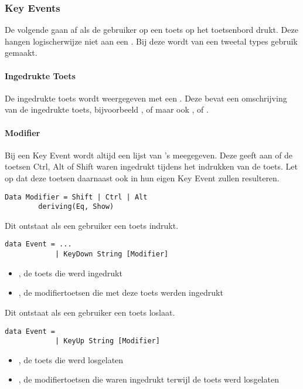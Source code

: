 \subsubsection{Key Events}
De volgende \events {}gaan af als de gebruiker op een toets op het toetsenbord drukt. Deze hangen logischerwijze niet aan een \shape. 
Bij deze \events wordt van een tweetal types gebruik gemaakt. 

\paragraph{Ingedrukte Toets}
De ingedrukte toets wordt weergegeven met een . Deze bevat een omschrijving van de ingedrukte toets, bijvoorbeeld ,  of  maar ook ,  of .

\paragraph{Modifier}
Bij een Key Event wordt altijd een lijst van 's meegegeven. Deze geeft aan of de toetsen Ctrl, Alt of Shift waren ingedrukt tijdens het indrukken van de toets. Let op dat deze toetsen daarnaast ook in hun eigen Key Event zullen resulteren.
\begin{lstlisting}
Data Modifier = Shift | Ctrl | Alt
		deriving(Eq, Show)
\end{lstlisting}

Dit  ontstaat als een gebruiker een toets indrukt.
\begin{lstlisting}
data Event = ...
			| KeyDown String [Modifier]
\end{lstlisting}
\begin{itemize}
	\item {}, de toets die werd ingedrukt
	\item \type{[Modifier]}, de modifiertoetsen die met deze toets werden ingedrukt
\end{itemize}

Dit  ontstaat als een gebruiker een toets loslaat.
\begin{lstlisting}
data Event =
			| KeyUp String [Modifier]
\end{lstlisting}
\begin{itemize}
	\item {}, de toets die werd losgelaten
	\item \type{[Modifier]}, de modifiertoetsen die waren ingedrukt terwijl de toets werd losgelaten
\end{itemize}

